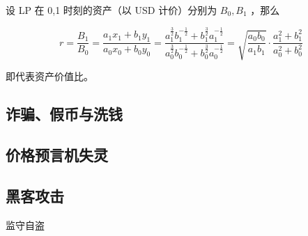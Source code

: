 \documentclass[12pt, a4paper, oneside]{ctexart}
\begin{document}
\noindent 设 LP 在 0,1 时刻的资产（以 USD 计价）分别为 $B_0,B_1$ ，那么

\begin{equation}
    r = \frac{B_1}{B_0} 
    = \frac{a_1x_1+b_1y_1}{a_0x_0+b_0y_0} 
    = \frac{a_1^{\frac{3}{2}}b_1^{-\frac{1}{2}} + b_1^{\frac{3}{2}}a_1^{-\frac{1}{2}}}{a_0^{\frac{3}{2}}b_0^{-\frac{1}{2}} + b_0^{\frac{3}{2}}a_0^{-\frac{1}{2}}} 
    = \sqrt{\frac{a_0b_0}{a_1b_1}} \cdot \frac{a_1^2+b_1^2}{a_0^2+b_0^2}
\end{equation}

\noindent 即代表资产价值比。

\subsection{诈骗、假币与洗钱}

\subsection{价格预言机失灵}

\subsection{黑客攻击}

监守自盗
\end{document}
